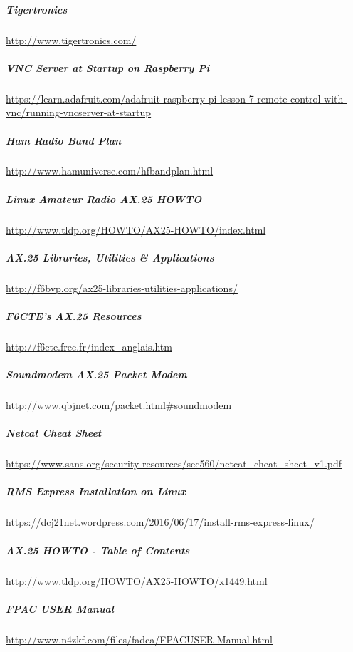 \subparagraph{Tigertronics}

\href{http://www.tigertronics.com}{http://www.tigertronics.com/}

\subparagraph{VNC Server at Startup on Raspberry Pi}

\href{https://learn.adafruit.com/adafruit-raspberry-pi-lesson-7-remote-control-with-vnc/running-vncserver-at-startup}{https://learn.adafruit.com/adafruit-raspberry-pi-lesson-7-remote-control-with-vnc/running-vncserver-at-startup}

\subparagraph{Ham Radio Band Plan}

\href{http://www.hamuniverse.com/hfbandplan.html}{http://www.hamuniverse.com/hfbandplan.html}

\subparagraph{Linux Amateur Radio AX.25 HOWTO}

\href{http://www.tldp.org/HOWTO/AX25-HOWTO/index.html}{http://www.tldp.org/HOWTO/AX25-HOWTO/index.html}

\subparagraph{AX.25 Libraries, Utilities \& Applications}

\href{http://f6bvp.org/ax25-libraries-utilities-applications/}{http://f6bvp.org/ax25-libraries-utilities-applications/}

\subparagraph{F6CTE's AX.25 Resources}

\href{http://f6cte.free.fr/index\_anglais.htm}{http://f6cte.free.fr/index\_anglais.htm}

\subparagraph{Soundmodem AX.25 Packet Modem}

\href{http://www.qbjnet.com/packet.html\#soundmodem}{http://www.qbjnet.com/packet.html\#soundmodem}

\subparagraph{Netcat Cheat Sheet}

\href{https://www.sans.org/security-resources/sec560/netcat\_cheat\_sheet\_v1.pdf}{https://www.sans.org/security-resources/sec560/netcat\_cheat\_sheet\_v1.pdf}

\subparagraph{RMS Express Installation on Linux}

\href{https://dcj21net.wordpress.com/2016/06/17/install-rms-express-linux/}{https://dcj21net.wordpress.com/2016/06/17/install-rms-express-linux/}

\subparagraph{AX.25 HOWTO - Table of Contents}

\href{http://www.tldp.org/HOWTO/AX25-HOWTO/x1449.html}{http://www.tldp.org/HOWTO/AX25-HOWTO/x1449.html}

\subparagraph{FPAC USER Manual}

\href{http://www.n4zkf.com/files/fadca/FPACUSER-Manual.html}{http://www.n4zkf.com/files/fadca/FPACUSER-Manual.html}

